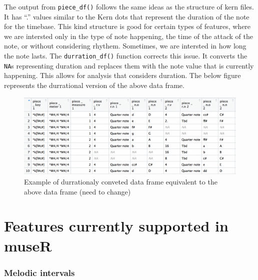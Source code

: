 \documentclass[12pt,twoside]{reedthesis}
\theoremstyle{definition}
\theoremstyle{definition}
\theoremstyle{definition}
\theoremstyle{remark}
\begin{document}
The output from \texttt{piece\_df()} follows the same ideas as the
structure of kern files. It has ``.'' values similar to the Kern dots
that represent the duration of the note for the timebase. This kind
structure is good for certain types of features, where we are intersted
only in the type of note happening, the time of the attack of the note,
or without considering rhythem. Sometimes, we are intersted in how long
the note lasts. The \texttt{durration\_df()} function corrects this
issue. It converts the \texttt{NA}s representing duration and replaces
them with the note value that is currently happening. This allows for
analysis that considers duration. The below figure represents the
durrational version of the above data frame.
\begin{figure}[h]
\centering
\includegraphics[scale = .5]{images/ex1r.png}
\caption{Example of durrationaly conveted data frame equivalent to the above data frame (need to change)}
\label{subd}
\end{figure}
\section{Features currently supported in
museR}\label{features-currently-supported-in-muser}

\subsubsection{Melodic intervals}\label{melodic-intervals}
\end{document}
